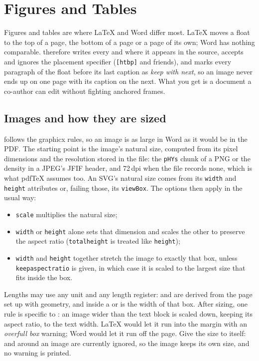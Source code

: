 \section{Figures and Tables}\label{sec:figures}

Figures and tables are where \LaTeX{} and Word differ most. \LaTeX{} moves a float to
the top of a page, the bottom of a page or a page of its own; Word has nothing comparable. \texdocx{} therefore writes every  and  where it
appears in the source, accepts and ignores the placement specifier (\texttt{[htbp]} and
friends), and marks every paragraph of the float before its last caption as
\emph{keep with next}, so an image never ends up on one page with its caption on the
next. What you get is a document a co-author can edit without fighting anchored frames.

\subsection{Images and how they are sized}\label{sec:figures-sizing}

 follows the \textsf{graphicx} rules, so an image is as large in Word
as it would be in the PDF. The starting point is the image's natural size, computed from
its pixel dimensions and the resolution stored in the file: the \texttt{pHYs} chunk of a
PNG or the density in a JPEG's JFIF header, and 72\,dpi when the file records none,
which is what pdf\TeX{} assumes too. An SVG's natural size comes from its \texttt{width}
and \texttt{height} attributes or, failing those, its \texttt{viewBox}. The options then
apply in the usual way:
\begin{itemize}
  \item \texttt{scale} multiplies the natural size;
  \item \texttt{width} or \texttt{height} alone sets that dimension and scales the other
        to preserve the aspect ratio (\texttt{totalheight} is treated like \texttt{height});
  \item \texttt{width} and \texttt{height} together stretch the image to exactly that box,
        unless \texttt{keepaspectratio} is given, in which case it is scaled to the
        largest size that fits inside the box.
\end{itemize}
Lengths may use any unit and any length register:  and  are
derived from the page set up with \textsf{geometry}, and inside a  or
  is the width of that box. After sizing, one rule is
specific to \texdocx: an image wider than the text block is scaled down, keeping its
aspect ratio, to the text width. \LaTeX{} would let it run into the margin with an
\emph{overfull box} warning; Word would let it run off the page. Give the size to
 itself:  and  around an image are
currently ignored, so the image keeps its own size, and no warning is printed.

